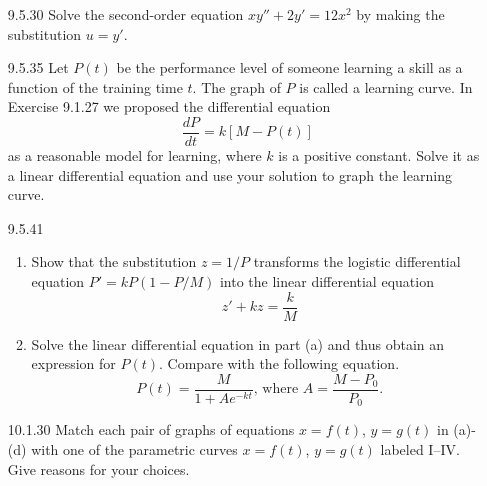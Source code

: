 \documentclass{article}
\begin{document}
\begin{enumerate}
\item[9.5.30]
    Solve the second-order equation $xy'' + 2y' = 12x^2$ by making the substitution $u=y'$.

    \vspace{5cm}

\item[9.5.35]
    Let $P(t)$ be the performance level of someone learning a skill as a function
    of the training time $t$. The graph of $P$ is called a learning curve.
    In Exercise 9.1.27 we proposed the differential equation
    \[\frac{dP}{dt} = k[M - P(t)]\]
    as a reasonable model for learning, where $k$ is a positive constant.
    Solve it as a linear differential equation and use your solution to graph the learning curve.

    \vspace{5cm}

\item[9.5.41]
    \begin{enumerate}
        \item Show that the substitution $z = 1/P$ transforms the logistic differential
            equation $P' = kP(1 - P/M)$ into the linear differential equation \[ z' + kz = \frac{k}{M}\]
        \item Solve the linear differential equation in part (a) and thus obtain
            an expression for $P(t)$. Compare with the following equation.
            \[
                P(t) = \frac{M}{1+A e^{-kt}} \text{, where }
                A = \frac{M - P_0}{P_0}.
            \]
    \end{enumerate}

    \newpage

\item[10.1.30]
    Match each pair of graphs of equations $x=f(t)$, $y=g(t)$ in (a)-(d) with one of
    the parametric curves $x=f(t)$, $y=g(t)$ labeled I–IV. Give reasons for your choices.


\end{enumerate}
\end{document}
